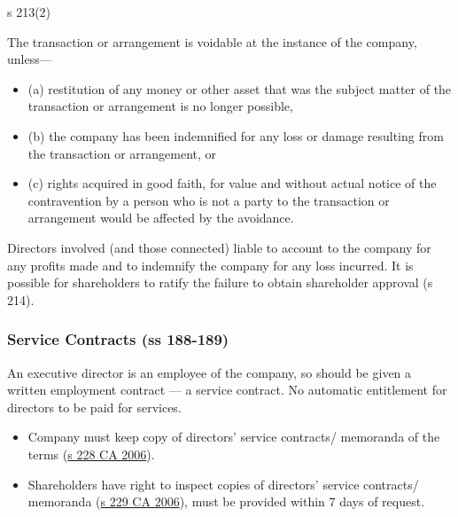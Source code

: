 \documentclass[
]{article}
\providecommand{\tightlist}{%
  \setlength{\itemsep}{0pt}\setlength{\parskip}{0pt}}
\newenvironment{env-136e818f-6bd8-45c9-b7d8-e6b8925f9e62}
{
    \savenotes\tcolorbox[blanker,breakable,left=5pt,borderline west={2pt}{-4pt}{green}]
}
{
    \endtcolorbox\spewnotes
}
\begin{document}
\begin{env-136e818f-6bd8-45c9-b7d8-e6b8925f9e62}

s 213(2)

The transaction or arrangement is voidable at the instance of the
company, unless---

\begin{itemize}
\tightlist
\item
  (a) restitution of any money or other asset that was the subject
  matter of the transaction or arrangement is no longer possible,
\item
  (b) the company has been indemnified for any loss or damage resulting
  from the transaction or arrangement, or
\item
  (c) rights acquired in good faith, for value and without actual notice
  of the contravention by a person who is not a party to the transaction
  or arrangement would be affected by the avoidance.
\end{itemize}

\end{env-136e818f-6bd8-45c9-b7d8-e6b8925f9e62}

Directors involved (and those connected) liable to account to the
company for any profits made and to indemnify the company for any loss
incurred. It is possible for shareholders to ratify the failure to
obtain shareholder approval (s 214).

\hypertarget{service-contracts-ss-188-189}{%
\subsubsection{Service Contracts (ss
188-189)}\label{service-contracts-ss-188-189}}

An executive director is an employee of the company, so should be given
a written employment contract --- a service contract. No automatic
entitlement for directors to be paid for services.

\begin{itemize}
\tightlist
\item
  Company must keep copy of directors' service contracts/ memoranda of
  the terms
  (\href{https://www.legislation.gov.uk/ukpga/2006/46/section/228}{s 228
  CA 2006}).
\item
  Shareholders have right to inspect copies of directors' service
  contracts/ memoranda
  (\href{https://www.legislation.gov.uk/ukpga/2006/46/section/229}{s 229
  CA 2006}), must be provided within 7 days of request.
\end{itemize}
\end{document}
